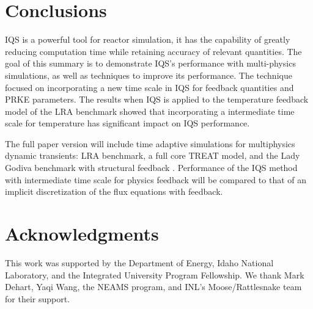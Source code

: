 \documentclass{anstrans}
\begin{document}
\section{Conclusions}

IQS is a powerful tool for reactor simulation, it has the capability of greatly reducing computation time while retaining accuracy of relevant quantities.  The goal of this summary is to demonstrate IQS's performance with multi-physics simulations, as well as techniques to improve its performance.  The technique focused on incorporating a new time scale in IQS for feedback quantities and PRKE parameters.  The results when IQS is applied to the temperature feedback model of the LRA benchmark showed that incorporating a intermediate time scale for temperature has significant impact on IQS performance.

The full paper version will include time adaptive simulations for multiphysics dynamic transients: LRA benchmark, a full core TREAT model, and the Lady Godiva benchmark with structural feedback \cite{CritSafetyHandbook}. Performance of the IQS method with intermediate time scale for physics feedback will be compared to that of an implicit discretization of the flux equations with feedback. 


\section{Acknowledgments}
This work was supported by the Department of Energy, Idaho National Laboratory, and the Integrated University Program Fellowship.  We thank Mark Dehart, Yaqi Wang, the NEAMS program, and INL's Moose/Rattlesnake team for their support.



\end{document}
